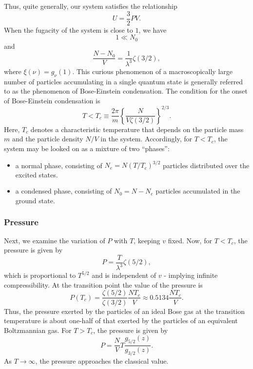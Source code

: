Thus, quite generally, our system satisfies the relationship
\[U = \frac{3}{2}PV.\]
When the fugacity of the system is close to $1$, we have 
\[1 \ll N_0 \]
and
\[\frac{N - N_0}{V} = \frac{1}{\lambda^3}\zeta(3/2) ,\] where $\xi(\nu) = g_{\nu}(1)$.
This curious phenomenon of a macroscopically large number of particles accumulating in a single quantum state is generally referred to as the phenomenon of Bose-Einstein condensation.
The condition for the onset of Bose-Einstein condensation is
\[T < T_c \equiv \frac{2\pi}{m} \left\{ \frac{N}{V\zeta(3/2)} \right\}^{2/3}.\]
Here, $T_c$ denotes a characteristic temperature that depends on the particle mass $m$ and the particle density $N/V$ in the system. Accordingly, for $T < T_c$, the system may be looked on as a mixture of two ``phases'':
\begin{itemize}
\item a normal phase, consisting of $N_e = N(T/T_c)^{3/2}$ particles distributed over the excited states.
\item a condensed phase, consisting of $N_0 = N - N_e$ particles accumulated in the ground state.
\end{itemize}

\subsubsection{Pressure}
Next, we examine the variation of $P$ with $T$, keeping $v$ fixed. Now, for $T < T_c$, the pressure is given by
\[P = \frac{T}{\lambda^3}\zeta(5/2),\]
which is proportional to $T^{5/2}$ and is independent of $v$ - implying infinite compressibility.
At the transition point the value of the pressure is
\[P(T_c) = \frac{\zeta(5/2)}{\zeta(3/2)} \frac{NT_c}{V} \approx 0.5134 \frac{NT_c}{V}.\]
Thus, the pressure exerted by the particles of an ideal Bose gas at the transition temperature is about one-half of that exerted by the particles of an equivalent Boltzmannian gas. For $T > T_c$, the pressure is given by
\[P = \frac{N}{V}T \frac{g_{5/2}(z)}{g_{3/2}(z)}.\]
As $T \to \infty$, the pressure approaches the classical value.

